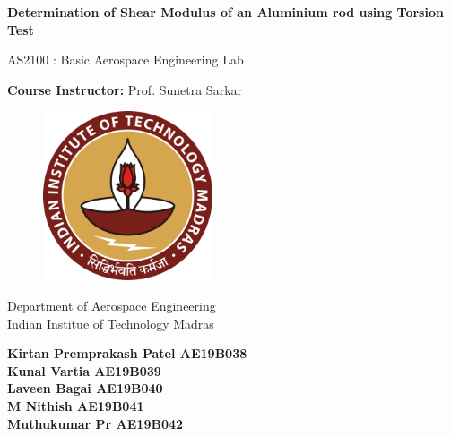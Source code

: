\documentclass[12pt,a4paper]{article}
\begin{document}
\begin{titlepage}
   \begin{center}
       \vspace*{1cm}

		\Huge
       \textbf{Determination of Shear Modulus of an Aluminium rod using Torsion Test}

       \vspace{0.5cm}
        AS2100 : Basic Aerospace Engineering Lab
            
       \vspace{1.5cm}

       \textbf{Course Instructor:}
       Prof. Sunetra Sarkar
\vspace{0.5cm}           
	   	\begin{figure}[h!]
	   	\centering
	   		\includegraphics[width=5cm]{Logo.png}
	   \end{figure}
         \vspace{0.5cm}
            Department of Aerospace Engineering\\
            Indian Institue of Technology Madras\\
            
         \vspace{3.6cm}
            \begin{flushright}
            	\textbf{Kirtan Premprakash Patel	AE19B038}\\
            	\textbf{Kunal Vartia	AE19B039}\\
            	\textbf{Laveen Bagai	AE19B040}\\
            	\textbf{M Nithish	AE19B041}\\
            	\textbf{Muthukumar Pr	AE19B042}
            \end{flushright}
   \end{center}
\end{titlepage}
\end{document}
